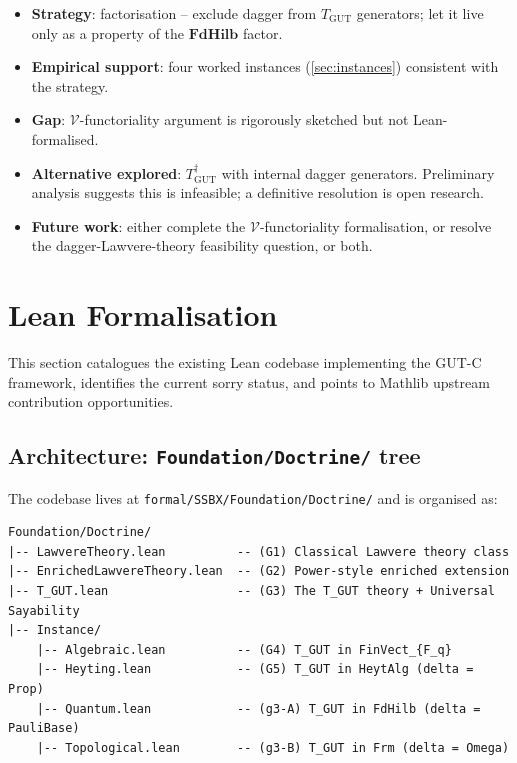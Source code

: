\documentclass[11pt,a4paper]{article}
\theoremstyle{plain}
\theoremstyle{definition}
\theoremstyle{remark}
\newcommand{\cat}[1]{\mathbf{#1}}
\newcommand{\FdHilb}{\cat{FdHilb}}
\newcommand{\TGUT}{T_{\mathrm{GUT}}}
\newcommand{\TGUTd}{T_{\mathrm{GUT}}^{\dagger}}
\begin{document}
\begin{itemize}[leftmargin=*]
\item \textbf{Strategy}: factorisation -- exclude dagger from $\TGUT$ generators; let it live only as a property of the $\FdHilb$ factor.
\item \textbf{Empirical support}: four worked instances (\cref{sec:instances}) consistent with the strategy.
\item \textbf{Gap}: $\mathcal{V}$-functoriality argument is rigorously sketched but not Lean-formalised.
\item \textbf{Alternative explored}: $\TGUTd$ with internal dagger generators. Preliminary analysis suggests this is infeasible; a definitive resolution is open research.
\item \textbf{Future work}: either complete the $\mathcal{V}$-functoriality formalisation, or resolve the dagger-Lawvere-theory feasibility question, or both.
\end{itemize}

\section{Lean Formalisation}\label{sec:lean}

This section catalogues the existing Lean codebase implementing the GUT-C framework, identifies the current sorry status, and points to Mathlib upstream contribution opportunities.

\subsection{Architecture: \texttt{Foundation/Doctrine/} tree}\label{sec:lean:arch}

The codebase lives at \texttt{formal/SSBX/Foundation/Doctrine/} and is organised as:

\begin{lstlisting}
Foundation/Doctrine/
|-- LawvereTheory.lean          -- (G1) Classical Lawvere theory class
|-- EnrichedLawvereTheory.lean  -- (G2) Power-style enriched extension
|-- T_GUT.lean                  -- (G3) The T_GUT theory + Universal Sayability
|-- Instance/
    |-- Algebraic.lean          -- (G4) T_GUT in FinVect_{F_q}
    |-- Heyting.lean            -- (G5) T_GUT in HeytAlg (delta = Prop)
    |-- Quantum.lean            -- (g3-A) T_GUT in FdHilb (delta = PauliBase)
    |-- Topological.lean        -- (g3-B) T_GUT in Frm (delta = Omega)
\end{lstlisting}
\end{document}

